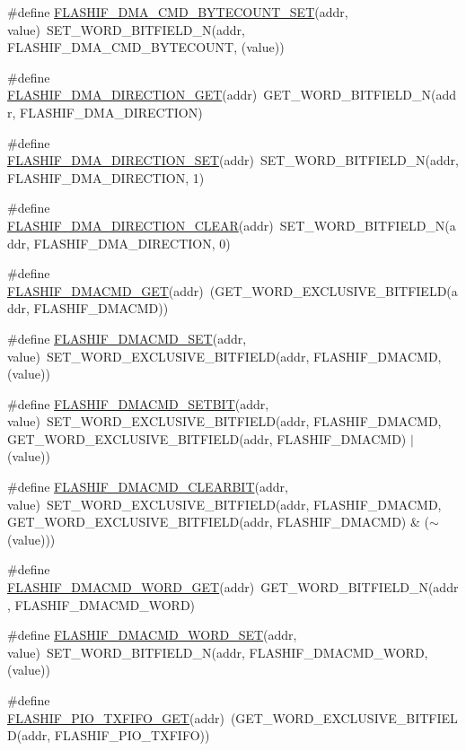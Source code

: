 \begin{DoxyCompactItemize}
\item 
\#define \hyperlink{a00551_aeaf5097bd6c37fe4f2f988cd94a89942}{FLASHIF\_\-DMA\_\-CMD\_\-BYTECOUNT\_\-SET}(addr, value)~SET\_\-WORD\_\-BITFIELD\_\-N(addr, FLASHIF\_\-DMA\_\-CMD\_\-BYTECOUNT, (value))
\item 
\#define \hyperlink{a00551_aa80d790d454a6589cd678c4730acdc86}{FLASHIF\_\-DMA\_\-DIRECTION\_\-GET}(addr)~GET\_\-WORD\_\-BITFIELD\_\-N(addr, FLASHIF\_\-DMA\_\-DIRECTION)
\item 
\#define \hyperlink{a00551_a5aa2662f4fb53efeac6c4fe1ba924646}{FLASHIF\_\-DMA\_\-DIRECTION\_\-SET}(addr)~SET\_\-WORD\_\-BITFIELD\_\-N(addr, FLASHIF\_\-DMA\_\-DIRECTION, 1)
\item 
\#define \hyperlink{a00551_a64cb5266099616022278afb7be80b503}{FLASHIF\_\-DMA\_\-DIRECTION\_\-CLEAR}(addr)~SET\_\-WORD\_\-BITFIELD\_\-N(addr, FLASHIF\_\-DMA\_\-DIRECTION, 0)
\item 
\#define \hyperlink{a00551_ab4f5066a5749d758d01e72975e7069d1}{FLASHIF\_\-DMACMD\_\-GET}(addr)~(GET\_\-WORD\_\-EXCLUSIVE\_\-BITFIELD(addr, FLASHIF\_\-DMACMD))
\item 
\#define \hyperlink{a00551_a0030c3812bb2287458af6aca05546222}{FLASHIF\_\-DMACMD\_\-SET}(addr, value)~SET\_\-WORD\_\-EXCLUSIVE\_\-BITFIELD(addr, FLASHIF\_\-DMACMD, (value))
\item 
\#define \hyperlink{a00551_a58292aeefd538841135658539c29c392}{FLASHIF\_\-DMACMD\_\-SETBIT}(addr, value)~SET\_\-WORD\_\-EXCLUSIVE\_\-BITFIELD(addr, FLASHIF\_\-DMACMD, GET\_\-WORD\_\-EXCLUSIVE\_\-BITFIELD(addr, FLASHIF\_\-DMACMD) $|$ (value))
\item 
\#define \hyperlink{a00551_a4c0cb508b4bf2f2375fe89e33065e660}{FLASHIF\_\-DMACMD\_\-CLEARBIT}(addr, value)~SET\_\-WORD\_\-EXCLUSIVE\_\-BITFIELD(addr, FLASHIF\_\-DMACMD, GET\_\-WORD\_\-EXCLUSIVE\_\-BITFIELD(addr, FLASHIF\_\-DMACMD) \& ($\sim$(value)))
\item 
\#define \hyperlink{a00551_a14086c6eb3633e1db190357378e99b49}{FLASHIF\_\-DMACMD\_\-WORD\_\-GET}(addr)~GET\_\-WORD\_\-BITFIELD\_\-N(addr, FLASHIF\_\-DMACMD\_\-WORD)
\item 
\#define \hyperlink{a00551_a513d8232ffd7c98dbfe4bece94c7b0c2}{FLASHIF\_\-DMACMD\_\-WORD\_\-SET}(addr, value)~SET\_\-WORD\_\-BITFIELD\_\-N(addr, FLASHIF\_\-DMACMD\_\-WORD, (value))
\item 
\#define \hyperlink{a00551_adf1bf4587940f6af34c1c66e74138176}{FLASHIF\_\-PIO\_\-TXFIFO\_\-GET}(addr)~(GET\_\-WORD\_\-EXCLUSIVE\_\-BITFIELD(addr, FLASHIF\_\-PIO\_\-TXFIFO))
\item 

\end{DoxyCompactItemize}
